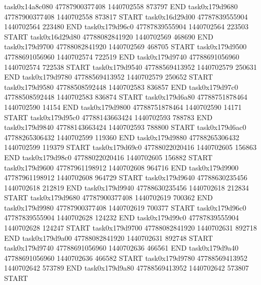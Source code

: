 task0x14a8c080 47787900377408          1440702558               873797  END
task0x179d9680 47787900377408          1440702558               873817  START
task0x16d29d00 47787839555904          1440702564               223480  END
task0x179d96c0 47787839555904          1440702564               223503  START
task0x16d29d80 47788082841920          1440702569               468690  END
task0x179d9700 47788082841920          1440702569               468705  START
task0x179d9500 47788691056960          1440702574               722519  END
task0x179d9740 47788691056960          1440702574               722538  START
task0x179d9540 47788569413952          1440702579               250631  END
task0x179d9780 47788569413952          1440702579               250652  START
task0x179d9580 47788508592448          1440702583               836857  END
task0x179d97c0 47788508592448          1440702583               836874  START
task0x179d6a80 47788751878464          1440702590                14154  END
task0x179d9800 47788751878464          1440702590                14171  START
task0x179d95c0 47788143663424          1440702593               788783  END
task0x179d9840 47788143663424          1440702593               788800  START
task0x179d6ac0 47788265306432          1440702599               119360  END
task0x179d9880 47788265306432          1440702599               119379  START
task0x179d69c0 47788022020416          1440702605               156863  END
task0x179d98c0 47788022020416          1440702605               156882  START
task0x179d9600 47787961198912          1440702608               964716  END
task0x179d9900 47787961198912          1440702608               964729  START
task0x179d9640 47788630235456          1440702618               212819  END
task0x179d9940 47788630235456          1440702618               212834  START
task0x179d9680 47787900377408          1440702619               700362  END
task0x179d9980 47787900377408          1440702619               700377  START
task0x179d96c0 47787839555904          1440702628               124232  END
task0x179d99c0 47787839555904          1440702628               124247  START
task0x179d9700 47788082841920          1440702631               892718  END
task0x179d9a00 47788082841920          1440702631               892748  START
task0x179d9740 47788691056960          1440702636               466561  END
task0x179d9a40 47788691056960          1440702636               466582  START
task0x179d9780 47788569413952          1440702642               573789  END
task0x179d9a80 47788569413952          1440702642               573807  START

